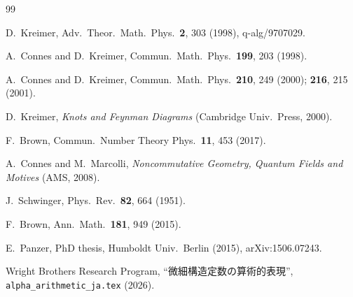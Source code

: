 \documentclass[11pt,a4paper]{article}
\begin{document}
\begin{thebibliography}{99}

D.~Kreimer, Adv.\ Theor.\ Math.\ Phys.\ \textbf{2}, 303 (1998),
q-alg/9707029.

A.~Connes and D.~Kreimer, Commun.\ Math.\ Phys.\ \textbf{199}, 203 (1998).

A.~Connes and D.~Kreimer, Commun.\ Math.\ Phys.\ \textbf{210}, 249 (2000);
\textbf{216}, 215 (2001).

D.~Kreimer, \textit{Knots and Feynman Diagrams}
(Cambridge Univ.\ Press, 2000).

F.~Brown, Commun.\ Number Theory Phys.\ \textbf{11}, 453 (2017).

A.~Connes and M.~Marcolli, \textit{Noncommutative Geometry, Quantum
Fields and Motives} (AMS, 2008).

J.~Schwinger, Phys.\ Rev.\ \textbf{82}, 664 (1951).

F.~Brown, Ann.\ Math.\ \textbf{181}, 949 (2015).

E.~Panzer, PhD thesis, Humboldt Univ.\ Berlin (2015), arXiv:1506.07243.

Wright Brothers Research Program, ``微細構造定数の算術的表現'',
\texttt{alpha\_arithmetic\_ja.tex} (2026).

\end{thebibliography}
\end{document}
